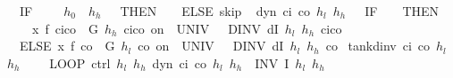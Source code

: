 \documentclass[envcountsame,envcountsect]{llncs}
\begin{document}
\begin{example}
\begin{isabellebody}
\ \ {\isacharparenleft}IF\ {\isacharparenleft}{\isasympi}\ {\isacharequal}\ {}\ {\isasymand}\ $h_0$\ {\isasymge}\ $h_h$\ {\isacharminus}\ {}{\isacharparenright}\ THEN\ {\isacharparenleft}{\isasympi}\ {\isacharcolon}{\isacharcolon}{\isacharequal}\ {}{\isacharparenright}\ ELSE\ skip{\isacharparenright}{\isacharparenright}{\isachardoublequoteclose}\isanewline
\isanewline
{}\ %
{\isachardoublequoteopen}dyn\ c\isactrlsub i\ c\isactrlsub o\ $h_l$\ $h_h$\ {\isasymtau}\ {\isasymequiv}\ IF\ {\isacharparenleft}{\isasympi}\ {\isacharequal}\ {}{\isacharparenright}\ THEN\ \isanewline
\ \ \ \ x{\isasymacute}{\isacharequal}\ f\ {\isacharparenleft}c\isactrlsub i{\isacharminus}c\isactrlsub o{\isacharparenright}\ {\isacharampersand}\ G\ $h_h$\ {\isacharparenleft}c\isactrlsub i{\isacharminus}c\isactrlsub o{\isacharparenright}\ on\ {\isacharbraceleft}{}{\isachardot}{\isachardot}{\isasymtau}{\isacharbraceright}\ UNIV\ {\isacharat}\ {}\ DINV\ {\isacharparenleft}dI\ $h_l$\ $h_h$\ {\isacharparenleft}c\isactrlsub i{\isacharminus}c\isactrlsub o{\isacharparenright}{\isacharparenright}\isanewline
\ \ ELSE\ x{\isasymacute}{\isacharequal}\ f\ {\isacharparenleft}{\isacharminus}c\isactrlsub o{\isacharparenright}\ {\isacharampersand}\ G\ $h_l$\ {\isacharparenleft}{\isacharminus}c\isactrlsub o{\isacharparenright}\ on\ {\isacharbraceleft}{}{\isachardot}{\isachardot}{\isasymtau}{\isacharbraceright}\ UNIV\ {\isacharat}\ {}\ DINV\ {\isacharparenleft}dI\ $h_l$\ $h_h$\ {\isacharparenleft}{\isacharminus}c\isactrlsub o{\isacharparenright}{\isacharparenright}{\isachardoublequoteclose}\isanewline
\isanewline
{}\isamarkupfalse%
\ {\isachardoublequoteopen}tank{\isacharunderscore}dinv\ c\isactrlsub i\ c\isactrlsub o\ $h_l$\ $h_h$\ {\isasymtau}\ {\isasymequiv}\isanewline 
\ \ LOOP\ {\isacharparenleft}ctrl\ $h_l$\ $h_h${\isacharsemicolon}\ dyn\ c\isactrlsub i\ c\isactrlsub o\ $h_l$\ $h_h$\ {\isasymtau}{\isacharparenright}\ INV\ {\isacharparenleft}I\ $h_l$\ $h_h${\isacharparenright}{\isachardoublequoteclose}\isanewline
\end{isabellebody}


\end{example}
\end{document}
